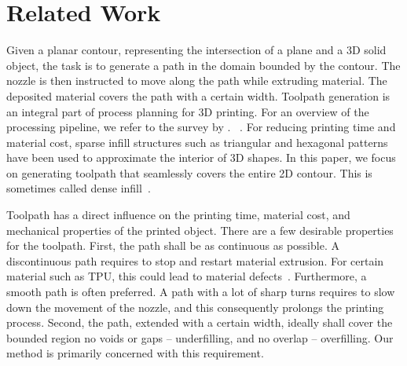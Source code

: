 \section{Related Work}

Given a planar contour, representing the intersection of a plane and a 3D solid object, the task is to generate a path in the domain bounded by the contour.
The nozzle is then instructed to move along the path while extruding material.
The deposited material covers the path with a certain width.
Toolpath generation is an integral part of process planning for 3D printing.
For an overview of the processing pipeline, we refer to the survey by \citeauthor{Livesu2017CGF}.~\cite{Livesu2017CGF} .
For reducing printing time and material cost, sparse infill structures such as triangular and hexagonal patterns have been used to approximate the interior of 3D shapes.
In this paper, we focus on generating toolpath that seamlessly covers the entire 2D contour.
This is sometimes called dense infill~\cite{Livesu2017CGF}.

Toolpath has a direct influence on the printing time, material cost, and mechanical properties of the printed object.
There are a few desirable properties for the toolpath.
First, the path shall be as continuous as possible.
A discontinuous path requires to stop and restart material extrusion. 
For certain material such as TPU, this could lead to material defects~\cite{KUIPERS2019CAD}.
Furthermore, a smooth path is often preferred.
A path with a lot of sharp turns requires to slow down the movement of the nozzle, and this consequently prolongs the printing process.
Second, the path, extended with a certain width, ideally shall cover the bounded region no voids or gaps --  underfilling, and no overlap -- overfilling.
Our method is primarily concerned with this requirement. 

